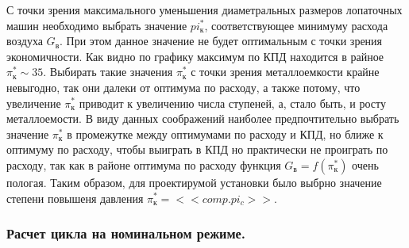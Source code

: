 \documentclass[a4paper,12pt]{article}
\begin{document}
    С точки зрения максимального уменьшения диаметральных размеров лопаточных машин необходимо выбрать
    значение $pi_к^*$, соответствующее минимуму расхода воздуха $G_в$.
    При этом данное значение не будет оптимальным с точки зрения экономичности.
    Как видно по графику максимум по КПД находится в райное $\pi_к^* \sim 35$.
    Выбирать такие значения $\pi_к^*$ с точки зрения металлоемкости крайне невыгодно, так они далеки от оптимума
    по расходу, а также потому, что увеличение $\pi_к^*$ приводит к увеличению числа ступеней, а, стало быть, и
    росту металлоемости.
    В виду данных соображений наиболее предпочтительно выбрать значение $\pi_к^*$ в промежутке между оптимумами
    по расходу и КПД, но ближе к оптимуму по расходу, чтобы выиграть в КПД но практически не проиграть по расходу,
    так как в районе оптимума по расходу функция $G_в = f(\pi_к^*)$ очень пологая.
    Таким образом, для проектирумой установки было выбрно значение степени повышеня давления $\pi_к^* = <<comp.pi_c>>$.

    \subsubsection{Расчет цикла на номинальном режиме.}
\end{document}
